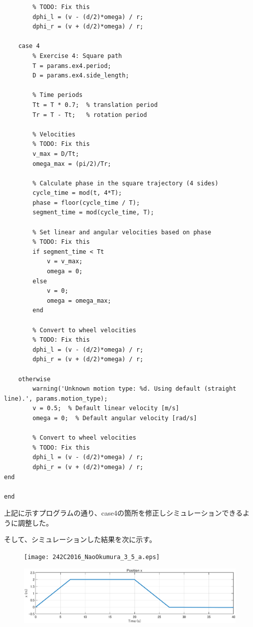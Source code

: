 \documentclass[10pt,a4paper,titlepage]{jreport} %
\begin{document}
\begin{lstlisting}[caption=modified＿mobile＿robot＿controller.m]
        % Convert to wheel velocities
        % TODO: Fix this
        dphi_l = (v - (d/2)*omega) / r;
        dphi_r = (v + (d/2)*omega) / r;
        
    case 4
        % Exercise 4: Square path
        T = params.ex4.period;
        D = params.ex4.side_length;
        
        % Time periods
        Tt = T * 0.7;  % translation period
        Tr = T - Tt;   % rotation period
        
        % Velocities
        % TODO: Fix this
        v_max = D/Tt;
        omega_max = (pi/2)/Tr;
        
        % Calculate phase in the square trajectory (4 sides)
        cycle_time = mod(t, 4*T);
        phase = floor(cycle_time / T);
        segment_time = mod(cycle_time, T);
        
        % Set linear and angular velocities based on phase
        % TODO: Fix this
        if segment_time < Tt
            v = v_max;
            omega = 0;
        else
            v = 0;
            omega = omega_max;
        end
        
        % Convert to wheel velocities
        % TODO: Fix this
        dphi_l = (v - (d/2)*omega) / r;
        dphi_r = (v + (d/2)*omega) / r;
        
    otherwise
        warning('Unknown motion type: %d. Using default (straight line).', params.motion_type);
        v = 0.5;  % Default linear velocity [m/s]
        omega = 0;  % Default angular velocity [rad/s]
        
        % Convert to wheel velocities
        % TODO: Fix this
        dphi_l = (v - (d/2)*omega) / r;
        dphi_r = (v + (d/2)*omega) / r;
end

end

\end{lstlisting}

上記に示すプログラムの通り、case4の箇所を修正しシミュレーションできるように調整した。

そして、シミュレーションした結果を次に示す。

\begin{figure}[H] %
  \centering
  \texttt{[image: 242C2016\_NaoOkumura\_3\_5\_a.eps]} %
\end{figure}

\begin{figure}[H] %
  \centering
  \includegraphics[width=0.6\linewidth]{242C2016_NaoOkumura_3_5_b.eps} %
\end{figure}
\end{document}
